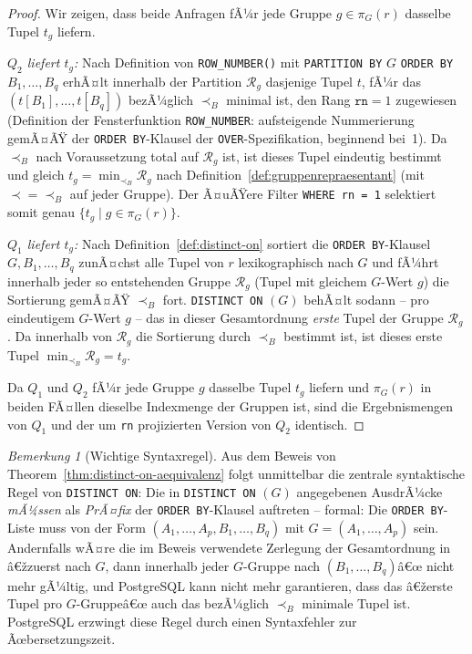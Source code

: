 ﻿\documentclass[a4paper,12pt]{report}
\theoremstyle{definition}
\theoremstyle{remark}
\newtheorem{remark}{Bemerkung}[chapter]
\newcommand{\R}{\mathcal{R}}
\begin{document}
\begin{proof}
Wir zeigen, dass beide Anfragen fÃ¼r jede Gruppe $g\in\pi_G(r)$
dasselbe Tupel $t_g$ liefern.

\emph{$Q_2$ liefert $t_g$:} Nach Definition von \texttt{ROW\_NUMBER()}
mit \texttt{PARTITION BY} $G$ \texttt{ORDER BY} $B_1,\ldots,B_q$
erhÃ¤lt innerhalb der Partition $\R_g$ dasjenige Tupel $t$, fÃ¼r das
$(t[B_1],\ldots,t[B_q])$ bezÃ¼glich $\prec_B$ minimal ist, den Rang
$\texttt{rn}=1$ zugewiesen (Definition der Fensterfunktion
\texttt{ROW\_NUMBER}: aufsteigende Nummerierung gemÃ¤ÃŸ der
\texttt{ORDER BY}-Klausel der \texttt{OVER}-Spezifikation, beginnend
bei~1). Da $\prec_B$ nach Voraussetzung total auf $\R_g$ ist, ist
dieses Tupel eindeutig bestimmt und gleich $t_g=\min_{\prec_B}\R_g$
nach Definition~\ref{def:gruppenrepraesentant} (mit $\prec=\prec_B$
auf jeder Gruppe). Der Ã¤uÃŸere Filter \texttt{WHERE rn = 1} selektiert
somit genau $\{t_g \mid g\in\pi_G(r)\}$.

\emph{$Q_1$ liefert $t_g$:} Nach Definition~\ref{def:distinct-on}
sortiert die \texttt{ORDER BY}-Klausel $G,B_1,\ldots,B_q$ zunÃ¤chst
alle Tupel von $r$ lexikographisch nach $G$ und fÃ¼hrt innerhalb jeder
so entstehenden Gruppe $\R_g$ (Tupel mit gleichem $G$-Wert $g$) die
Sortierung gemÃ¤ÃŸ $\prec_B$ fort. \texttt{DISTINCT ON} $(G)$ behÃ¤lt
sodann -- pro eindeutigem $G$-Wert $g$ -- das in dieser Gesamtordnung
\emph{erste} Tupel der Gruppe $\R_g$. Da innerhalb von $\R_g$ die
Sortierung durch $\prec_B$ bestimmt ist, ist dieses erste Tupel
$\min_{\prec_B}\R_g=t_g$.

Da $Q_1$ und $Q_2$ fÃ¼r jede Gruppe $g$ dasselbe Tupel $t_g$ liefern
und $\pi_G(r)$ in beiden FÃ¤llen dieselbe Indexmenge der Gruppen ist,
sind die Ergebnismengen von $Q_1$ und der um \texttt{rn} projizierten
Version von $Q_2$ identisch. \qedhere
\end{proof}

\begin{remark}[Wichtige Syntaxregel]
\label{rem:distinct-on-regel}
Aus dem Beweis von Theorem~\ref{thm:distinct-on-aequivalenz} folgt
unmittelbar die zentrale syntaktische Regel von
\texttt{DISTINCT ON}: Die in \texttt{DISTINCT ON} $(G)$ angegebenen
AusdrÃ¼cke \emph{mÃ¼ssen} als \emph{PrÃ¤fix} der \texttt{ORDER
BY}-Klausel auftreten -- formal: Die \texttt{ORDER BY}-Liste muss von
der Form $(A_1,\ldots,A_p,B_1,\ldots,B_q)$ mit $G=(A_1,\ldots,A_p)$
sein. Andernfalls wÃ¤re die im Beweis verwendete Zerlegung der
Gesamtordnung in â€žzuerst nach $G$, dann innerhalb jeder $G$-Gruppe
nach $(B_1,\ldots,B_q)$â€œ nicht mehr gÃ¼ltig, und PostgreSQL kann nicht
mehr garantieren, dass das â€žerste Tupel pro $G$-Gruppeâ€œ auch das
bezÃ¼glich $\prec_B$ minimale Tupel ist. PostgreSQL erzwingt diese
Regel durch einen Syntaxfehler zur Ãœbersetzungszeit.
\end{remark}
\end{document}
